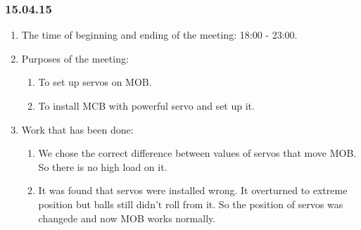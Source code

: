 \subsubsection{15.04.15}
\begin{enumerate}
	
	\item The time of beginning and ending of the meeting: 18:00 - 23:00.
	
	\item Purposes of the meeting: 
	\begin{enumerate}
		
		\item To set up servos on MOB.
		
		\item To install MCB with powerful servo and set up it.
		
	\end{enumerate}

	\item Work that has been done:
	\begin{enumerate}
		
		\item We chose the correct difference between values of servos that move MOB. So there is no high load on it.
		
		\item It was found that servos were installed wrong. It overturned to extreme position but balls still didn't roll from it. So the position of servos was changede and now MOB works normally.
		

\end{enumerate}
\end{enumerate}
